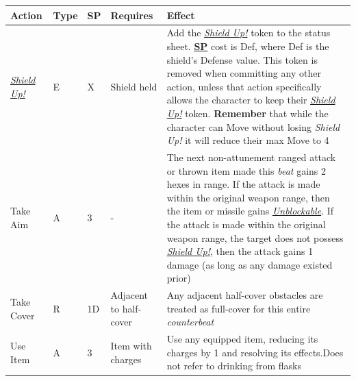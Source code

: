 \documentclass[12pt]{article}
\newcommand{\refto}[1]{\hyperlink{#1}{\textbf{#1}}}
\newcommand{\reftoit}[1]{\hyperlink{#1}{\emph{#1}}}
\begin{document}
\begin{center}
\begin{tabularx}{\textwidth}{p{}p{}p{}p{}p{}}
\hline
\rowcolor{white} \textbf{Action} & \textbf{Type} & \textbf{SP} & \textbf{Requires} & \textbf{Effect}\setcounter{rownum}{0}\\
\hline
\reftoit{Shield Up!} & E & X & Shield held & Add the \reftoit{Shield Up!} token to the status sheet.\newline
\refto{SP} cost is Def, where Def is the shield’s Defense value.\newline
This token is removed when committing any other action, unless that action specifically allows the character to keep their \reftoit{Shield Up!} token.\newline
\textbf{Remember} that while the character can Move without losing \emph{Shield Up!} it will reduce their max Move to 4\\
Take Aim & A & 3 & - & The next non-attunement ranged attack or thrown item made this \emph{beat} gains 2 hexes in range.\newline
If the attack is made within the original weapon range, then the item or missile gains \reftoit{Unblockable}.\newline
If the attack is made within the original weapon range, the target does not possess \reftoit{Shield Up!}, then the attack gains 1 damage (as long as any damage existed prior)\\
Take Cover & R & 1D & Adjacent to half-cover & Any adjacent half-cover obstacles are treated as full-cover for this entire \emph{counterbeat}\\
Use Item & A & 3 & Item with charges & Use any equipped item, reducing its charges by 1 and resolving its effects.\newline Does not refer to drinking from flasks\\
\hline
\end{tabularx}
\end{center}

\pagebreak
\end{document}
